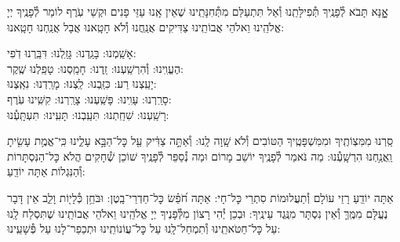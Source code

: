 \documentclass[twoside, openany, parskip=half, 11pt]{book}
\begin{document}
אׇׇׇׇנָּא תָּבֹא לְ֯פָנֶֽיךָ תְּ֯פִילָּתֵֽנוּ וְ֯אַל תִּתְעַלַּם מִתְּ֯חִנָּתֵֽינוּ שֶׁאֵין אָֽנוּ עַזֵּי פָנִים וּקְשֵׁי עֹֽרֶף לוֹמַר לְ֯פָנֶֽיךָ יְיָ אֱלֹהֵֽינוּ וֵאלֹהֵי אֲבוֹתֵֽינוּ צַדִּיקִים אֲנַֽחֲנוּ וְ֯לֹא חָטָֽאנוּ אֲבָל אֲנַֽחְנוּ חָטָֽאנוּ:

אָשַֽׁמְנוּ: בָּגַֽדְנוּ: גָּזַֽלְנוּ: דִּבַּֽרְנוּ דֹֽפִי: \\
הֶעֱוִֽינוּ: וְ֯הִרְשַֽׁעְנוּ: זַֽדְנוּ: חָמַֽסְנוּ: טָפַֽלְנוּ שֶֽׁקֶר:\\
יָעַֽצְנוּ רַע: כִּזַּֽבְנוּ: לַֽצְנוּ: מָרַֽדְנוּ: נִאַֽצְנוּ: \\
סָרַֽרְנוּ: עָוִֽינוּ: פָּשַֽׁעְנוּ: צָרַֽרְנוּ: קִשִּֽׁינוּ עֹֽרֶף:\\
רָשַֽׁעְנוּ: שִׁחַֽתְנוּ: תִּעַֽבְנוּ: תָּעִֽינוּ: תִּעְתָּֽעְ֯נוּ:

סַֽרְנוּ מִמִּצְוֹתֶֽיךָ וּמִמִּשְׁפָּטֶֽיךָ הַטּוֹבִים וְ֯לֹא שָֽׁוָה לָֽנוּ: וְ֯אַתָּ֣ה צַדִּ֔יק עַ֖ל כׇּל־הַבָּ֣א עָלֵ֑ינוּ כִּֽי־אֱמֶ֥ת עָשִׂ֖יתָ וַֽאֲנַ֥חְנוּ הִרְשָֽׁעְ֯נוּ: מַה נֹּאמַר לְ֯פָנֶֽיךָ יוֹשֵׁב מָרוֹם וּמַה נְ֯סַפֵּר לְ֯פָנֶֽיךָ שׁוֹכֵן שְׁ֯חָקִים הֲלֹא כׇּל־הַנִּסְתָּרוֹת וְ֯הַנִּגְלוֹת אַתָּה יוֹדֵֽעַ:

אַתָּה יוֹדֵֽעַ רָזֵי עוֹלָם וְ֯תַעֲלוּמוֹת סִתְרֵי כׇּל־חָי: אַתָּה חֹ֝פֵ֗שׂ כׇּל־חַדְרֵי־בָֽטֶן: וּבֹּחֵ֥ן כְּ֯לָי֖וֹת וָלֵ֑ב אֵין דָּבָר נֶעֱלָּם מִמֶּֽךָּ וְ֯אֵין נִסְתָּר מִנֶּֽגֶד עֵינֶֽיךָ: וּבְכֵן יְ֯הִי רָצוֹן מִלְּ֯פָנֶיךָ יְיָ אֱלֹהֵֽינוּ וֵאלֹהֵי אֲבוֹתֵֽינוּ שֶׁתִּסְלַח לָֽנוּ עַל כׇּל־חַטֹּאתֵֽינוּ וְ֯תִמְחַל־לָֽנוּ עַל כׇּל־עֲוֹנוֹתֵֽינוּ וּתְכַפֵר־לָנוּ עַל פְּ֯שָׁעֵֽינוּ:
\end{document}
